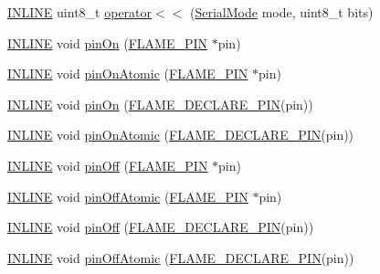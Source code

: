 \begin{DoxyCompactItemize}
\item 
\hyperlink{io_8h_a2eb6f9e0395b47b8d5e3eeae4fe0c116}{I\-N\-L\-I\-N\-E} uint8\-\_\-t \hyperlink{namespaceflame_a56504e7bc18cf7c6195bf223f1b3bc9e}{operator$<$$<$} (\hyperlink{namespaceflame_a9cbc9720f0e2f002f6f8fdf746fad4db}{Serial\-Mode} mode, uint8\-\_\-t bits)
\item 
\hyperlink{io_8h_a2eb6f9e0395b47b8d5e3eeae4fe0c116}{I\-N\-L\-I\-N\-E} void \hyperlink{namespaceflame_ab53db717ca5e8d10adc895debefcc567}{pin\-On} (\hyperlink{namespaceflame_ae345f4de995f89125721dd4f5cd4cd9f}{F\-L\-A\-M\-E\-\_\-\-P\-I\-N} $\ast$pin)
\item 
\hyperlink{io_8h_a2eb6f9e0395b47b8d5e3eeae4fe0c116}{I\-N\-L\-I\-N\-E} void \hyperlink{namespaceflame_ab8502671c52e0050f6002c77b6be869b}{pin\-On\-Atomic} (\hyperlink{namespaceflame_ae345f4de995f89125721dd4f5cd4cd9f}{F\-L\-A\-M\-E\-\_\-\-P\-I\-N} $\ast$pin)
\item 
\hyperlink{io_8h_a2eb6f9e0395b47b8d5e3eeae4fe0c116}{I\-N\-L\-I\-N\-E} void \hyperlink{namespaceflame_aed900b8b0a061178fe265ebcb52aff3a}{pin\-On} (\hyperlink{io_8h_ab54f3ca5cc36256b922289e8e92316a3}{F\-L\-A\-M\-E\-\_\-\-D\-E\-C\-L\-A\-R\-E\-\_\-\-P\-I\-N}(pin))
\item 
\hyperlink{io_8h_a2eb6f9e0395b47b8d5e3eeae4fe0c116}{I\-N\-L\-I\-N\-E} void \hyperlink{namespaceflame_adcfab7e61edaf82c6c6340e99bf928c0}{pin\-On\-Atomic} (\hyperlink{io_8h_ab54f3ca5cc36256b922289e8e92316a3}{F\-L\-A\-M\-E\-\_\-\-D\-E\-C\-L\-A\-R\-E\-\_\-\-P\-I\-N}(pin))
\item 
\hyperlink{io_8h_a2eb6f9e0395b47b8d5e3eeae4fe0c116}{I\-N\-L\-I\-N\-E} void \hyperlink{namespaceflame_a524c1b5e5ef2bfbcb56432eb62872e59}{pin\-Off} (\hyperlink{namespaceflame_ae345f4de995f89125721dd4f5cd4cd9f}{F\-L\-A\-M\-E\-\_\-\-P\-I\-N} $\ast$pin)
\item 
\hyperlink{io_8h_a2eb6f9e0395b47b8d5e3eeae4fe0c116}{I\-N\-L\-I\-N\-E} void \hyperlink{namespaceflame_a2c18ca2c57f5e6b8b528aff9c775afd7}{pin\-Off\-Atomic} (\hyperlink{namespaceflame_ae345f4de995f89125721dd4f5cd4cd9f}{F\-L\-A\-M\-E\-\_\-\-P\-I\-N} $\ast$pin)
\item 
\hyperlink{io_8h_a2eb6f9e0395b47b8d5e3eeae4fe0c116}{I\-N\-L\-I\-N\-E} void \hyperlink{namespaceflame_afcd11f48e323b8a22aafd060854d2871}{pin\-Off} (\hyperlink{io_8h_ab54f3ca5cc36256b922289e8e92316a3}{F\-L\-A\-M\-E\-\_\-\-D\-E\-C\-L\-A\-R\-E\-\_\-\-P\-I\-N}(pin))
\item 
\hyperlink{io_8h_a2eb6f9e0395b47b8d5e3eeae4fe0c116}{I\-N\-L\-I\-N\-E} void \hyperlink{namespaceflame_aedae5854b3bfdb934033440c59392f64}{pin\-Off\-Atomic} (\hyperlink{io_8h_ab54f3ca5cc36256b922289e8e92316a3}{F\-L\-A\-M\-E\-\_\-\-D\-E\-C\-L\-A\-R\-E\-\_\-\-P\-I\-N}(pin))

\end{DoxyCompactItemize}
